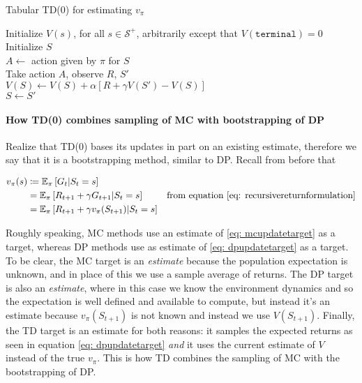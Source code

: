 \documentclass[12pt]{article}
\begin{document}
\begin{algorithm}[h]
  \caption{Tabular TD(0) for estimating $v_\pi$}
  \KwInput{The policy $\pi$ to be evaluated; step size $\alpha \in (0, 1]$}
  Initialize $V(s)$, for all $s \in \mathcal S^+$, arbitrarily except that   $V(\texttt{terminal}) = 0$ \\
 {
  Initialize $S$ \\
   {
    $A \gets $ action given by $\pi$ for $S$ \\
    Take action $A$, observe $R$, $S'$ \\
    $V(S) \gets V(S) + \alpha \left[ R + \gamma V(S') - V(S) \right]$ \\
    $S \gets S'$
  }
}
\end{algorithm}

\paragraph{How TD(0) combines sampling of MC with bootstrapping of DP}
Realize that TD(0) bases its updates in part on an existing estimate, therefore we say that it is a bootstrapping method, similar to DP. Recall from before that

\begin{align}
  \label{eq: mcupdatetarget}
  v_\pi(s) &\coloneqq \mathbb E_\pi \left[G_t | S_t = s \right] \\
           &= \mathbb E_\pi \left[R_{t+1} + \gamma G_{t+1} | S_t = s \right]                       &\textrm{from equation \ref{eq: recursivereturnformulation}} \\
  \label{eq: dpupdatetarget}
           &= \mathbb E_\pi \left[ R_{t+1} + \gamma v_\pi(S_{t+1}) | S_t = s \right]
\end{align}

Roughly speaking, MC methods use an estimate of \ref{eq: mcupdatetarget} as a target, whereas DP methods use as estimate of \ref{eq: dpupdatetarget} as a target. To be clear, the MC target is an \emph{estimate} because the population expectation is unknown, and in place of this we use a sample average of returns. The DP target is also an \emph{estimate}, where in this case we know the environment dynamics and so the expectation is well defined and available to compute, but instead it's an estimate because $v_\pi(S_{t+1})$ is not known and instead we use $V(S_{t+1})$. Finally, the TD target is an estimate for both reasons: it samples the expected returns as seen in equation \ref{eq: dpupdatetarget} \emph{and} it uses the current estimate of $V$ instead of the true $v_\pi$. This is how TD combines the sampling of MC with the bootstrapping of DP.
\end{document}

